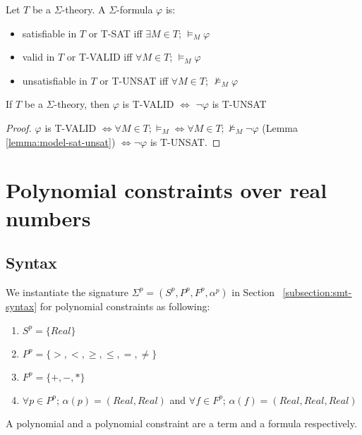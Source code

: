 \begin{definition}
Let $T$ be a $\Sigma$-theory. A $\Sigma$-formula $\varphi$ is:
\begin{itemize}
\item satisfiable in $T$ or T-SAT iff $\exists M \in T$; $\models_{M} \varphi$
\item valid in $T$ or T-VALID iff $\forall M \in T$; $\models_{M} \varphi$
\item unsatisfiable in $T$ or T-UNSAT iff $\forall M \in T$; $\not\models_{M} \varphi$
\end{itemize}
\end{definition}

\begin{lemma} \label{lemma:theory-valid-unsat}
If $T$ be a $\Sigma$-theory, then $\varphi$ is T-VALID $\iff$ $\neg\varphi$ is T-UNSAT
\end{lemma}

\begin{proof}
$\varphi$ is T-VALID $\iff \forall M \in T; \models_{M} \iff \forall M \in T; \not\models_{M} \neg\varphi$ (Lemma \ref{lemma:model-sat-unsat}) $\iff \neg\varphi$ is T-UNSAT.
\end{proof}

\section{Polynomial constraints over real numbers}
\subsection{Syntax}
We instantiate the signature $\Sigma^p = (S^p, P^p, F^p, \alpha^p)$ in Section ~\ref{subsection:smt-syntax} for polynomial constraints as following:
\begin{enumerate}
\item $S^p = \{Real\}$
\item $P^p = \{>, <, \ge, \le, =, \not=\}$
\item $F^p = \{+, -, *\}$
\item $\forall p \in P^p$; $\alpha(p) = (Real, Real)$ and $\forall f \in F^p$; $\alpha(f) = (Real, Real, Real)$
\end{enumerate}
A polynomial and a polynomial constraint are a term and a formula respectively.

